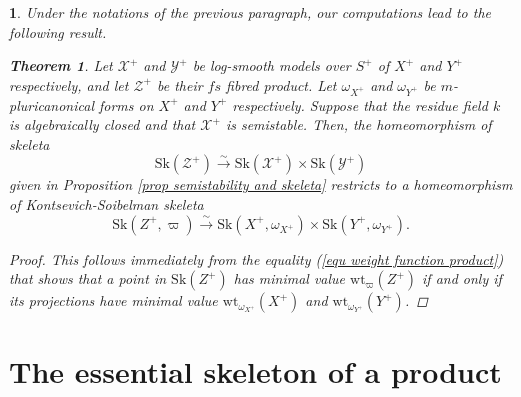 \documentclass{amsart}%
\numberwithin{equation}{subsection}
\theoremstyle{plain2}
\newtheorem{thm}[equation]{Theorem}
\newtheorem{cor}[equation]{Corollary}
\theoremstyle{definition2}
\theoremstyle{stepstyle}
\theoremstyle{point}
\theoremstyle{subpoint}
\newtheorem{subpoint}[equation]{}%
\newcommand{\spa}[1]{\begin{subpoint}#1\end{subpoint}}           %
\newcommand{\cX}{\ensuremath{\mathscr{X}}}
\newcommand{\cY}{\ensuremath{\mathscr{Y}}}
\newcommand{\cZ}{\ensuremath{\mathscr{Z}}}
\renewcommand{\cZ}{\ensuremath{\mathscr{Z}}}
\renewcommand{\cY}{\ensuremath{\mathscr{Y}}}
\newcommand{\weight}{\mathrm{wt}}
\newcommand{\Sk}{\mathrm{Sk}}
\begin{document}
\spa{Under the notations of the previous paragraph, our computations lead to the following result.
\begin{thm}  \label{thm semistability and KS skeleta}
Let $\cX^+$ and $\cY^+$ be log-smooth models over $S^+$ of $X^+$ and $Y^+$ respectively, and let $\cZ^+$ be their $fs$ fibred product. Let $\omega_{X^+}$ and $\omega_{Y^+}$ be  $m$-pluricanonical forms on $X^+$ and $Y^+$ respectively. Suppose that the residue field $k$ is algebraically closed and that $\cX^+$ is semistable. Then, the homeomorphism of skeleta $$\Sk(\cZ^+) \xrightarrow{\sim} \Sk(\cX^+) \times \Sk(\cY^+)$$ given in Proposition \ref{prop semistability and skeleta} restricts to a homeomorphism of Kontsevich-Soibelman skeleta $$\Sk(Z^+, \varpi) \xrightarrow{\sim} \Sk(X^+, \omega_{X^+}) \times \Sk(Y^+, \omega_{Y^+}).$$ 
\end{thm}
\begin{proof}
This follows immediately from the equality (\ref{equ weight function product}) that shows that a point in $\Sk(Z^+)$ has minimal value $\weight_{\varpi}(Z^+)$ if and only if its projections have minimal value $\weight_{\omega_{X^+}}(X^+)$ and $\weight_{\omega_{Y^+}}(Y^+)$.
\end{proof}
}

\section{The essential skeleton of a product}
%
%
\end{document}
